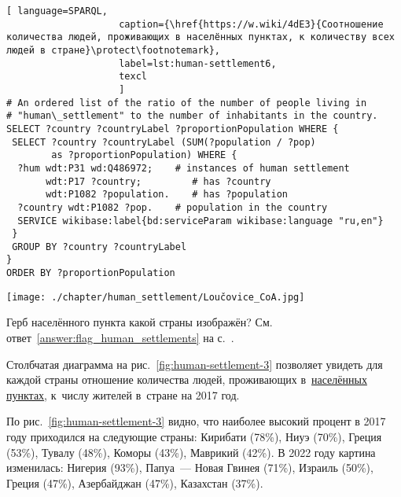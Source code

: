 \begin{lstlisting}[ language=SPARQL, 
                    caption={\href{https://w.wiki/4dE3}{Соотношение количества людей, проживающих в населённых пунктах, к количеству всех людей в стране}\protect\footnotemark},
                    label=lst:human-settlement6,
                    texcl 
                    ]
# An ordered list of the ratio of the number of people living in 
# "human\_settlement" to the number of inhabitants in the country.
SELECT ?country ?countryLabel ?proportionPopulation WHERE {
 SELECT ?country ?countryLabel (SUM(?population / ?pop) 
        as ?proportionPopulation) WHERE {
  ?hum wdt:P31 wd:Q486972;    # instances of human settlement  
       wdt:P17 ?country;         # has ?country 
       wdt:P1082 ?population.    # has ?population
  ?country wdt:P1082 ?pop.    # population in the country
  SERVICE wikibase:label{bd:serviceParam wikibase:language "ru,en"}
 }
 GROUP BY ?country ?countryLabel
}
ORDER BY ?proportionPopulation
\end{lstlisting}%
%
\begin{marginfigure}[-23\baselineskip]
{\texttt{[image: ./chapter/human\_settlement/Loučovice\_CoA.jpg]}}
  \caption[Герб третьего неизвестного населённого пункта.]{Герб населённого пункта какой страны изображён?\newline 
            См. ответ~\ref{answer:flag_human_settlements} на с.~\pageref{answer:flag_human_settlements}.}%
  \label{fig:flag_question_human_settlements3}%
\end{marginfigure}

Столбчатая диаграмма на рис.~\ref{fig:human-settlement-3} позволяет увидеть для каждой страны 
отношение количества людей, 
проживающих в~\href{http://www.wikidata.org/entity/Q486972}{населённых пунктах}, 
к~числу жителей в~стране на 2017 год.


По рис.~\ref{fig:human-settlement-3} видно, 
что наиболее высокий процент в 2017 году приходился на следующие страны: 
Кирибати (78\%), Ниуэ (70\%), Греция (53\%), Тувалу (48\%), Коморы (43\%), Маврикий (42\%). 
В 2022 году картина изменилась: Нигерия (93\%), Папуа~--- Новая Гвинея (71\%), 
Израиль (50\%), Греция (47\%), Азербайджан (47\%), Казахстан (37\%). 



